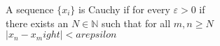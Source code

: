 \documentclass[preview]{standalone}
\begin{document}
\begin{center}
A sequence $\{x_i\}$ is Cauchy if for every $\varepsilon > 0$ if \\there exists an $N \in \mathbb{N}$ such that for all $m,n \geq N$\\$\big| x_n - x_m 
ight| < arepsilon$
\end{center}
\end{document}
